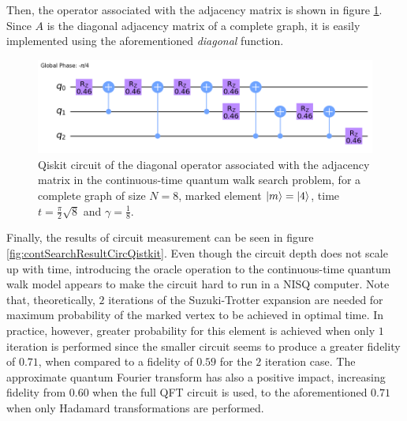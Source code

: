 \documentclass[../../dissertation.tex]{subfiles}
\begin{document}
Then, the operator associated with the adjacency matrix is shown in figure
\ref{fig:contSearchAdjCircQistkit}. Since $A$ is the diagonal adjacency matrix
of a complete graph, it is easily implemented using the aforementioned
\textit{diagonal} function.\par
\begin{figure}[!h]
	\centering
	\includegraphics[scale=0.30]{img/Qiskit/ContQuantumWalk/Search/Circuits/circAjd_N3_S2.png}
	\caption{Qiskit circuit of the  diagonal operator associated with the adjacency matrix in the continuous-time quantum walk search problem, for a complete graph of size $N=8$, marked element $\ket{m}=\ket{4}$, time $t=\frac{\pi}{2} \sqrt{8}$ and $\gamma = \frac{1}{8}$.}
	\label{fig:contSearchAdjCircQistkit}
\end{figure}
Finally, the results of circuit measurement can be seen in figure
\ref{fig:contSearchResultCircQistkit}. Even though the circuit depth does not
scale up with time, introducing the oracle operation to the continuous-time
quantum walk model appears to make the circuit hard to run in a NISQ computer.
Note that, theoretically, $2$ iterations of the Suzuki-Trotter expansion are
needed for maximum probability of the marked vertex to be achieved in optimal
time.  In practice, however, greater probability for this element is achieved
when only $1$ iteration is performed since the smaller circuit seems to produce
a greater fidelity of $0.71$, when compared to a fidelity of $0.59$ for the $2$
iteration case. The approximate quantum Fourier transform has also a positive
impact, increasing fidelity from $0.60$ when the full QFT circuit is used, to
the aforementioned $0.71$ when only Hadamard transformations are performed.
\end{document}
